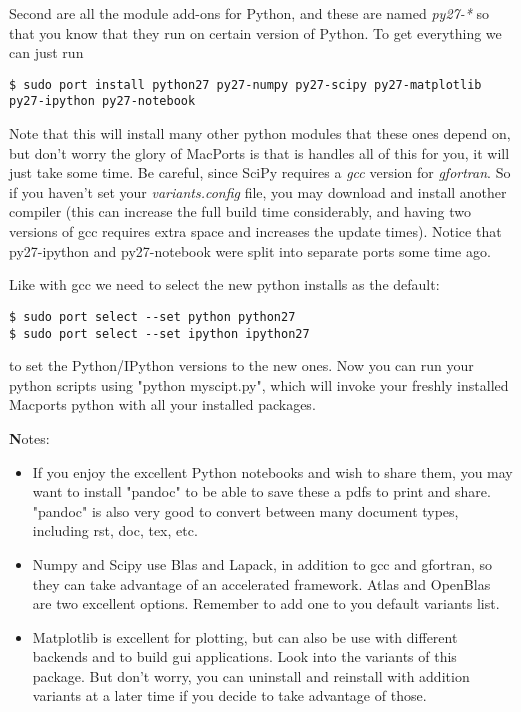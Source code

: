 \documentclass[11pt, A4paper]{article}
\begin{document}
Second are all the module add-ons for Python, and these are named \textit{py27-*} so that you know that they run on certain version of Python. To get everything we can just run
\begin{lstlisting}[style=Bash]
$ sudo port install python27 py27-numpy py27-scipy py27-matplotlib py27-ipython py27-notebook
\end{lstlisting}
Note that this will install many other python modules that these ones depend on, but don't worry the glory of MacPorts is that is handles all of this for you, it will just take some time. Be careful, since SciPy requires a \textit{gcc} version for \textit{gfortran}. So if you haven't set your \textit{variants.config} file, you may download and install another compiler (this can increase the full build time considerably, and having two versions of gcc requires extra space and increases the update times). Notice that py27-ipython and py27-notebook were split into separate ports some time ago.

Like with gcc we need to select the new python installs as the default:
\begin{lstlisting}[style=Bash]
$ sudo port select --set python python27
$ sudo port select --set ipython ipython27
\end{lstlisting}
to set the Python/IPython versions to the new ones. Now you can run your python scripts using "python myscipt.py", which will invoke your freshly installed Macports python with all your installed packages.

{\textbf Notes:}
\begin{itemize}
	\item If you enjoy the excellent Python notebooks and wish to share them, you may want to install "pandoc" to be able to save these a pdfs to print and share. "pandoc" is also very good to convert between many document types, including rst, doc, tex, etc.
	\item Numpy and Scipy use Blas and Lapack, in addition to gcc and gfortran, so they can take advantage of an accelerated framework. Atlas and OpenBlas are two excellent options. Remember to add one to you default variants list.
	\item Matplotlib is excellent for plotting, but can also be use with different backends and to build gui applications. Look into the variants of this package. But don't worry, you can uninstall and reinstall with addition variants at a later time if you decide to take advantage of those.
\end{itemize}
\end{document}
